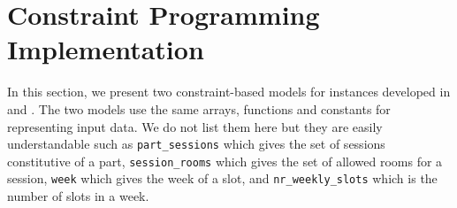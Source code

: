 \section{Constraint Programming Implementation}
\label{sec:cp-model}

\setcounter{equation}{0}
%
In this section, we present two constraint-based models for \UTP{} instances developed in \MINIZINC{} and \CHR{}.
The two models use the same arrays, functions and constants for representing input data. We do not list them here but they are easily understandable such as \texttt{part\_sessions} which gives the set of sessions constitutive of a part, \texttt{session\_rooms} which gives the set of allowed rooms for a session, \texttt{week} which gives the week of a slot, and \texttt{nr\_weekly\_slots} which is the number of slots in a week.

%


